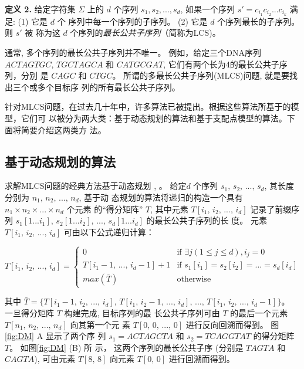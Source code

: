 \textbf{定义 2.} 给定字符集 $\Sigma$ 上的 $d$ 个序列 $s_1, s_2, ...,
s_d$, 如果一个序列 $s'=c_{i_1}c_{i_2}...c_{i_k}$ 满足: (1) 它是 $d$ 个
序列中每一个序列的子序列。 (2) 它是 $d$ 个序列最长的子序列。 则 $s'$ 被
称为这 $d$ 个序列的\emph{最长公共子序列}（简称为LCS)。

通常, 多个序列的最长公共子序列并不唯一。 例如，给定三个DNA序列 $ACTAGTGC$,
$TGCTAGCA$ 和 $CATGCGAT$, 它们有两个长为4的最长公共子序列，分别
是 $CAGC$ 和 $CTGC$。 所谓的多最长公共子序列(MLCS)问题, 就是要找出三个或多个目标序
列的所有最长公共子序列。

针对MLCS问题，在过去几十年中，许多算法已被提出。根据这些算法所基于的模型，它们可
以被分为两大类：基于动态规划的算法和基于支配点模型的算法。下面将简要介绍这两类方
法。

\subsection{基于动态规划的算法}
\label {sec:Dynamic Programming}

求解MLCS问题的经典方法基于动态规划 \cite{Smith1981}, \cite{Sankoff1972}。 给定$d$
个序列 $s_1,\, s_2,\,...,\, s_d$, 其长度分别为 $n_1,\, n_2,\, ...,\, n_d$, 基于动
态规划的算法将递归的构造一个具有 $n_1 \times n_2 \times ... \times n_d$ 个元素
的“得分矩阵” $T$, 其中元素 $T[i_1,\, i_2,\, ...,\, i_d]$ 记录了前缀序
列 $s_1[1...i_1]$, $s_2[1...i_2]$, ..., $s_d[1...i_d]$ 的最长公共子序列的长
度。 元素 $T[i_1,\, i_2,\, ...,\, i_d]$ 可由以下公式递归计算：

\begin{equation}
  T[i_1,\, i_2,\, ...,\, i_d] =
  \begin{cases}
    0 & \text{if $\exists j(1 \leq j \leq d), i_j = 0$}\\
    T[i_1-1,\, ...,\, i_d-1] + 1  & \text{if $s_1[i_1] = s_2[i_2] =
      ... = s_d[i_d]$}\\
    max(\bar{T}) & \text{otherwise}
  \end{cases}
\end{equation}

其中
$\bar{T} = \{T[i_1-1,\, i_2,\, ...,\, i_d],\, T[i_1,\, i_2-1,\, ...,\, i_d],\,
...,\, T[i_1,\, i_2,\, ...,\, i_d-1]\}$。 一旦得分矩阵 $T$ 构建完成, 目标序列的最
长公共子序列可由 $T$ 的最后一个元素 $T[n_1,\, n_2,\, ...,\, n_d]$ 向其第一个元
素 $T[0,\, 0,\, ...,\, 0]$ 进行反向回溯而得到。 图 \ref{fig:DM} A 显示了两个序
列 $s_1 = ACTAGCTA$ 和 $s_2 = TCAGGTAT$ 的得分矩阵 $T$。 如图\ref{fig:DM} (B) 所
示， 这两个序列的最长公共子序 (分别是 $TAGTA$ 和 $CAGTA$), 可由元素 $T[8,\, 8]$
向元素 $T[0,\, 0]$ 进行回溯而得到。

